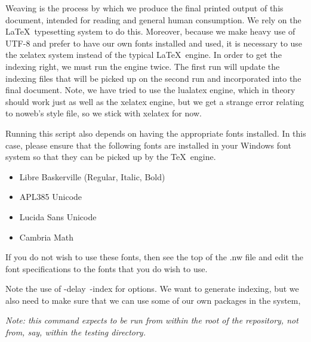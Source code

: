 \documentclass{article}%
\begin{document}
Weaving is the process by which we produce the final printed output
of this document,
intended for reading and general human consumption.
We rely on the \LaTeX\ typesetting system to do this.
Moreover, because we make heavy use of UTF-8 and prefer to have our
own fonts installed and used,
it is necessary to use the {\Tt{}xelatex\nwendquote} system instead of the typical
\LaTeX\ engine.
In order to get the indexing right, we must run the engine twice.
The first run will update the indexing files that will be picked
up on the second run and incorporated into the final document.
Note, we have tried to use the {\Tt{}lualatex\nwendquote} engine, which in theory
should work just as well as the {\Tt{}xelatex\nwendquote} engine, but we get a
strange error relating to noweb's style file, so we stick with
{\Tt{}xelatex\nwendquote} for now.

Running this script also depends on having the appropriate fonts
installed.
In this case, please ensure that the following fonts are installed
in your Windows font system so that they can be picked up by the \TeX\
engine.

\begin{itemize}
        \item Libre Baskerville (Regular, Italic, Bold)
        \item APL385 Unicode
        \item Lucida Sans Unicode
        \item Cambria Math
\end{itemize}

\noindent
If you do not wish to use these fonts, then see the top of the
{\Tt{}.nw\nwendquote} file and edit the font specifications to the fonts that
you do wish to use.

Note the use of {\Tt{}-delay\ -index\nwendquote} for options. We want to generate
indexing, but we also need to make sure that we can use some of our
own packages in the system,

\emph{Note: this command expects to be run from within the root of
the repository, not from, say, within the {\Tt{}testing\nwendquote} directory.}
\end{document}
